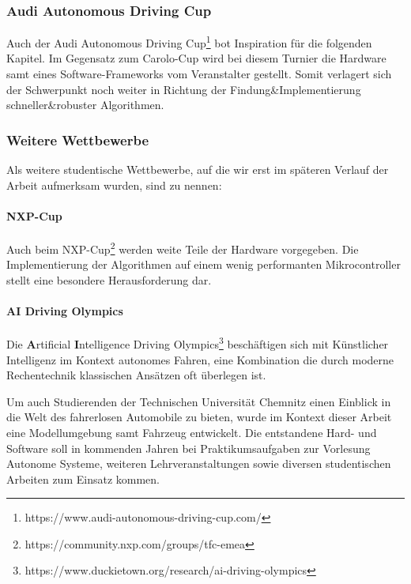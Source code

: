 \subsubsection{Audi Autonomous Driving Cup}
Auch der Audi Autonomous Driving Cup\footnote{https://www.audi-autonomous-driving-cup.com/} bot Inspiration für die folgenden Kapitel. Im Gegensatz zum Carolo-Cup wird bei diesem Turnier die Hardware samt eines Software-Frameworks vom Veranstalter gestellt. Somit verlagert sich der Schwerpunkt noch weiter in Richtung der Findung\&Implementierung schneller\&robuster Algorithmen. 

\subsubsection{Weitere Wettbewerbe}
Als weitere studentische Wettbewerbe, auf die wir erst im späteren Verlauf der Arbeit aufmerksam wurden, sind zu nennen:
\paragraph{NXP-Cup}
Auch beim NXP-Cup\footnote{https://community.nxp.com/groups/tfc-emea} werden weite Teile der Hardware vorgegeben. Die Implementierung der Algorithmen auf einem wenig performanten Mikrocontroller stellt eine besondere Herausforderung dar. 
\paragraph{AI Driving Olympics}
Die \textbf{A}rtificial \textbf{I}ntelligence Driving Olympics\footnote{https://www.duckietown.org/research/ai-driving-olympics} beschäftigen sich mit Künstlicher Intelligenz im Kontext autonomes Fahren, eine Kombination die durch moderne Rechentechnik klassischen Ansätzen oft überlegen ist. 

Um auch Studierenden der Technischen Universität Chemnitz einen Einblick in die Welt des fahrerlosen Automobile zu bieten, wurde im Kontext dieser Arbeit eine Modellumgebung samt Fahrzeug entwickelt. Die entstandene Hard- und Software soll in kommenden Jahren bei Praktikumsaufgaben zur Vorlesung \glqq Autonome Systeme\grqq{}, weiteren Lehrveranstaltungen sowie diversen studentischen Arbeiten zum Einsatz kommen. 


